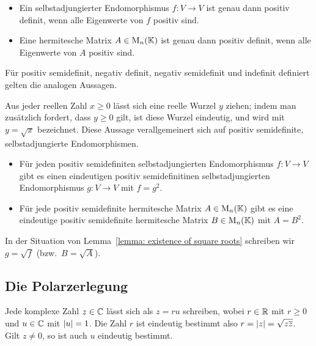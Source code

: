 \begin{corollary}
  \leavevmode
  \begin{itemize}
    \item
      Ein selbstadjungierter Endomorphismus $f \colon V \to V$ ist genau dann positiv definit, wenn alle Eigenwerte von $f$ positiv sind.
    \item
      Eine hermitesche Matrix $A \in \operatorname{M}_{n}(\mathbb{K})$ ist genau dann positiv definit, wenn alle Eigenwerte von $A$ positiv sind.
  \end{itemize}
  Für positiv semidefinit, negativ definit, negativ semidefinit und indefinit definiert gelten die analogen Aussagen.
\end{corollary}

Aus jeder reellen Zahl $x \geq 0$ lässt sich eine reelle Wurzel $y$ ziehen;
indem man zusätzlich fordert, dass $y \geq 0$ gilt, ist diese Wurzel eindeutig, und wird mit $y = \sqrt{x}$ bezeichnet.
Diese Aussage verallgemeinert sich auf positiv semidefinite, selbstadjungierte Endomorphismen.

\begin{lemma}
  \label{lemma: existence of square roots}
  \leavevmode
  \begin{itemize}
    \item
      Für jeden positiv semidefiniten selbstadjungierten Endomorphismus $f \colon V \to V$ gibt es einen eindeutigen positiv semidefinitinen selbstadjungierten Endomorphismus $g \colon V \to V$ mit $f = g^2$.
    \item
      Für jede positiv semidefinite hermitesche Matrix $A \in \operatorname{M}_{n}(\mathbb{K})$ gibt es eine eindeutige positiv semidefinite hermitesche Matrix $B \in \operatorname{M}_{n}(\mathbb{K})$ mit $A = B^2$.
  \end{itemize}
\end{lemma}

In der Situation von Lemma~\ref{lemma: existence of square roots} schreiben wir $g = \sqrt{f}$ (bzw.\ $B = \sqrt{A}$).



\subsection*{Die Polarzerlegung}

Jede komplexe Zahl $z \in \mathbb{C}$ lässt sich als $z = r u$ schreiben, wobei $r \in \mathbb{R}$ mit $r \geq 0$ und $u \in \mathbb{C}$ mit $\left| u \right| = 1$.
Die Zahl $r$ ist eindeutig bestimmt also $r = \left| z \right| = \sqrt{z \overline{z}}$.
Gilt $z \neq 0$, so ist auch $u$ eindeutig bestimmt.

